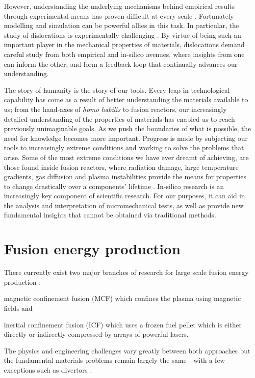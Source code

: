 However, understanding the underlying mechanisms behind empirical results through experimental means has proven difficult at every scale \cite{multiscale_model_mats1, multiscale_model_mats2}. Fortunately modelling and simulation can be powerful allies in this task. In particular, the study of dislocations is experimentally challenging \cite{dln_exp_obs1, dln_exp_obs2, dln_exp_obs3}. By virtue of being such an important player in the mechanical properties of materials, dislocations demand careful study from both empirical and in-silico avenues, where insights from one can inform the other, and form a feedback loop that continually advances our understanding.

The story of humanity is the story of our tools. Every leap in technological capability has come as a result of better understanding the materials available to us; from the hand-axes of \textit{homo habilis} to fusion reactors, our increasingly detailed understanding of the properties of materials has enabled us to reach previously unimaginable goals. As we push the boundaries of what is possible, the need for knowledge becomes more important. Progress is made by subjecting our tools to increasingly extreme conditions and working to solve the problems that arise. Some of the most extreme conditions we have ever dreamt of achieving, are those found inside fusion reactors, where radiation damage, large temperature gradients, gas diffusion and plasma instabilities provide the means for properties to change drastically over a components' lifetime \cite{fusmat1, mats_fusion1, mats_fusion2}. In-silico research is an increasingly key component of scientific research. For our purposes, it can aid in the analysis and interpretation of micromechanical tests, as well as provide new fundamental insights that cannot be obtained via traditional methods.

\section{Fusion energy production}
\label{s:fusion}

There currently exist two major branches of research for large scale fusion energy production \cite{icfvsmcf}:
\begin{inparaenum}
    \item magnetic confinement fusion (MCF) \cite{mcf} which confines the plasma using magnetic fields and
    \item inertial confinement fusion (ICF) \cite{icf} which uses a frozen fuel pellet which is either directly or indirectly compressed by arrays of powerful lasers.
\end{inparaenum}
The physics and engineering challenges vary greatly between both approaches but the fundamental materials problems remain largely the same---with a few exceptions such as divertors \cite{icf_mcf1, icf_mcf2}.

